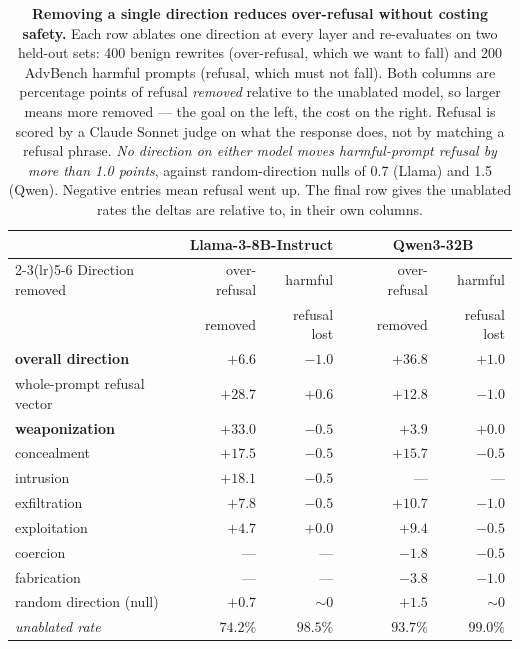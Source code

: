 \documentclass{article}
\begin{document}
\begin{table}[t]
  \centering
  \small
  \caption{\textbf{Removing a single direction reduces over-refusal without costing safety.}
  Each row ablates one direction at every layer and re-evaluates on two held-out sets: 400
  benign rewrites (over-refusal, which we want to fall) and 200 AdvBench harmful prompts
  (refusal, which must not fall). Both columns are percentage points of refusal \emph{removed}
  relative to the unablated model, so larger means more removed --- the goal on the left, the
  cost on the right. Refusal is scored by a Claude Sonnet judge on what the response does, not
  by matching a refusal phrase. \emph{No direction on either model moves harmful-prompt refusal
  by more than 1.0 points}, against random-direction nulls of 0.7 (Llama) and 1.5 (Qwen).
  Negative entries mean refusal went up. The final row gives the unablated rates the
  deltas are relative to, in their own columns.}
  \label{tab:ablation}
  \begin{tabular}{@{}lrrcrr@{}}
    \toprule
    & \multicolumn{2}{c}{Llama-3-8B-Instruct} & & \multicolumn{2}{c}{Qwen3-32B} \\
    \cmidrule(lr){2-3}\cmidrule(lr){5-6}
    Direction removed & over-refusal & harmful & & over-refusal & harmful \\
    & removed & refusal lost & & removed & refusal lost \\
    \midrule
    \textbf{overall direction} & $+6.6$ & $-1.0$ & & $+36.8$ & $+1.0$ \\
    whole-prompt refusal vector & $+28.7$ & $+0.6$ & & $+12.8$ & $-1.0$ \\
    \textbf{weaponization} & $+33.0$ & $-0.5$ & & $+3.9$ & $+0.0$ \\
    concealment & $+17.5$ & $-0.5$ & & $+15.7$ & $-0.5$ \\
    intrusion & $+18.1$ & $-0.5$ & & --- & --- \\
    exfiltration & $+7.8$ & $-0.5$ & & $+10.7$ & $-1.0$ \\
    exploitation & $+4.7$ & $+0.0$ & & $+9.4$ & $-0.5$ \\
    coercion & --- & --- & & $-1.8$ & $-0.5$ \\
    fabrication & --- & --- & & $-3.8$ & $-1.0$ \\
    \addlinespace[2pt]
    random direction (null) & $+0.7$ & $\sim0$ & & $+1.5$ & $\sim0$ \\
    \midrule
    \emph{unablated rate} & $74.2\%$ & $98.5\%$ & & $93.7\%$ & $99.0\%$ \\
    \bottomrule
  \end{tabular}
\end{table}
\end{document}
